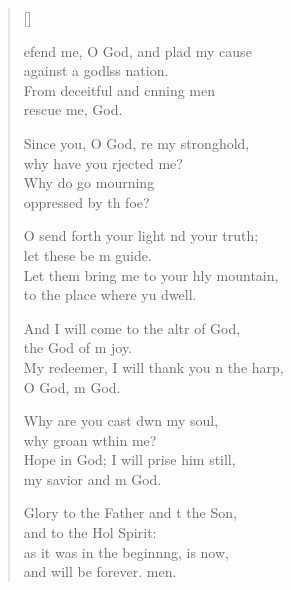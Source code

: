\settowidth{\versewidth}{Let them bring me to your holy mountain}
\begin{verse}[\versewidth]
  \begin{patverse}
    efend me, O God, and plad my cause\Med\\
against a godlss nation.\\
From deceitful and cnning men\Med\\
rescue me,  God.

Since you, O God, re my stronghold,\Med\\
why have you rjected me?\\
Why do  go mourning\Med\\
oppressed by th foe?

O send forth your light nd your truth;\Med\\
let these be m guide.\\
Let them bring me to your hly mountain,\Med\\
to the place where yu dwell.

And I will come to the altr of God,\Med\\
the God of m joy.\\
My redeemer, I will thank you n the harp,\Med\\
O God, m God.

Why are you cast dwn my soul,\Med\\
why groan w\pointup{\i}thin me?\\
Hope in God; I will prise him still,\Med\\
my savior and m God.

Glory to the Father and t the Son,\Med\\
and to the Hol Spirit:\\
as it was in the beginn\pointup{\i}ng, is now,\Med\\
and will be forever. men.
  \end{patverse}
\end{verse}
